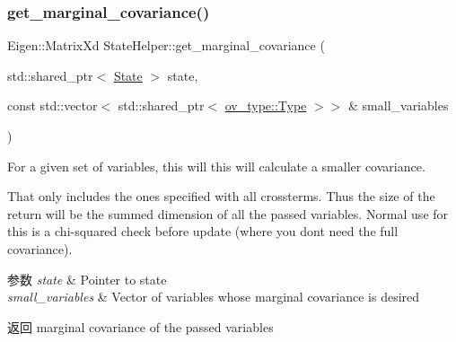 \subsubsection{\texorpdfstring{get\+\_\+marginal\+\_\+covariance()}{get\_marginal\_covariance()}}
{\footnotesize\ttfamily Eigen\+::\+Matrix\+Xd State\+Helper\+::get\+\_\+marginal\+\_\+covariance (\begin{DoxyParamCaption}\item[{std\+::shared\+\_\+ptr$<$ \hyperlink{classov__msckf_1_1State}{State} $>$}]{state,  }\item[{const std\+::vector$<$ std\+::shared\+\_\+ptr$<$ \hyperlink{classov__type_1_1Type}{ov\+\_\+type\+::\+Type} $>$$>$ \&}]{small\+\_\+variables }\end{DoxyParamCaption})\hspace{0.3cm}{\ttfamily [static]}}



For a given set of variables, this will this will calculate a smaller covariance. 

That only includes the ones specified with all crossterms. Thus the size of the return will be the summed dimension of all the passed variables. Normal use for this is a chi-\/squared check before update (where you don\textquotesingle{}t need the full covariance).


\begin{DoxyParams}{参数}
{\em state} & Pointer to state \\
\hline
{\em small\+\_\+variables} & Vector of variables whose marginal covariance is desired \\
\hline
\end{DoxyParams}
\begin{DoxyReturn}{返回}
marginal covariance of the passed variables 
\end{DoxyReturn}
\mbox{\label{classov__msckf_1_1StateHelper_a58ed364529ae3802a7110edf3ac4dbbb}} 

